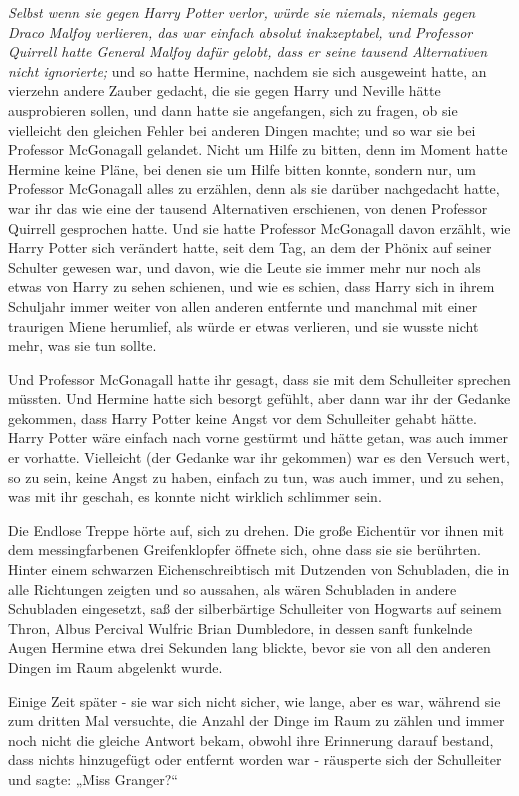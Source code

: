 {\emph{Selbst wenn sie gegen Harry Potter verlor, würde sie niemals, niemals gegen Draco Malfoy verlieren, das war einfach absolut inakzeptabel, und Professor Quirrell hatte General Malfoy dafür gelobt, dass er seine tausend Alternativen nicht ignorierte;} und so hatte Hermine, nachdem sie sich ausgeweint hatte, an vierzehn andere Zauber gedacht, die sie gegen Harry und Neville hätte ausprobieren sollen, und dann hatte sie angefangen, sich zu fragen, ob sie vielleicht den gleichen Fehler bei anderen Dingen machte; und so war sie bei Professor McGonagall gelandet. Nicht um Hilfe zu bitten, denn im Moment hatte Hermine keine Pläne, bei denen sie um Hilfe bitten konnte, sondern nur, um Professor McGonagall alles zu erzählen, denn als sie darüber nachgedacht hatte, war ihr das wie eine der tausend Alternativen erschienen, von denen Professor Quirrell gesprochen hatte. Und sie hatte Professor McGonagall davon erzählt, wie Harry Potter sich verändert hatte, seit dem Tag, an dem der Phönix auf seiner Schulter gewesen war, und davon, wie die Leute sie immer mehr nur noch als etwas von Harry zu sehen schienen, und wie es schien, dass Harry sich in ihrem Schuljahr immer weiter von allen anderen entfernte und manchmal mit einer traurigen Miene herumlief, als würde er etwas verlieren, und sie wusste nicht mehr, was sie tun sollte.

Und Professor McGonagall hatte ihr gesagt, dass sie mit dem Schulleiter sprechen müssten. Und Hermine hatte sich besorgt gefühlt, aber dann war ihr der Gedanke gekommen, dass Harry Potter keine Angst vor dem Schulleiter gehabt hätte. Harry Potter wäre einfach nach vorne gestürmt und hätte getan, was auch immer er vorhatte. Vielleicht (der Gedanke war ihr gekommen) war es den Versuch wert, so zu sein, keine Angst zu haben, einfach zu tun, was auch immer, und zu sehen, was mit ihr geschah, es konnte nicht wirklich schlimmer sein.

Die Endlose Treppe hörte auf, sich zu drehen. Die große Eichentür vor ihnen mit dem messingfarbenen Greifenklopfer öffnete sich, ohne dass sie sie berührten. Hinter einem schwarzen Eichenschreibtisch mit Dutzenden von Schubladen, die in alle Richtungen zeigten und so aussahen, als wären Schubladen in andere Schubladen eingesetzt, saß der silberbärtige Schulleiter von Hogwarts auf seinem Thron, Albus Percival Wulfric Brian Dumbledore, in dessen sanft funkelnde Augen Hermine etwa drei Sekunden lang blickte, bevor sie von all den anderen Dingen im Raum abgelenkt wurde.

Einige Zeit später - sie war sich nicht sicher, wie lange, aber es war, während sie zum dritten Mal versuchte, die Anzahl der Dinge im Raum zu zählen und immer noch nicht die gleiche Antwort bekam, obwohl ihre Erinnerung darauf bestand, dass nichts hinzugefügt oder entfernt worden war - räusperte sich der Schulleiter und sagte: „Miss Granger?“

}
